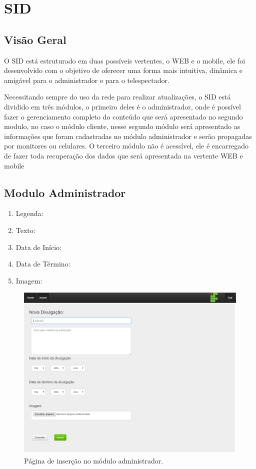 \chapter[SID]{SID}
\section{Visão Geral}
O SID está estruturado em duas possíveis vertentes, o WEB e o mobile, ele foi
desenvolvido com o objetivo de oferecer uma forma mais intuitiva, dinâmica e amigável
para o administrador e para o telespectador.

Necessitando sempre do uso da rede para realizar atualizações, o SID está dividido
em três módulos, o primeiro deles é o administrador, onde é possível fazer o gerenciamento
completo do conteúdo que será apresentado no segundo modulo, no caso o módulo cliente,
nesse segundo módulo será apresentado as informações que foram cadastradas no módulo
administrador e serão propagadas por monitores ou celulares. O terceiro módulo não é
acessível, ele é encarregado de fazer toda recuperação dos dados que será apresentada na
vertente WEB e mobile

\section{Modulo Administrador}
 \begin{enumerate}
   \item Legenda: 
   \item Texto: 
   \item Data de Início:
   \item Data de Término:
   \item Imagem:
 \end{enumerate}
 
 \begin{figure}[!htb]
\centering
\includegraphics[scale=0.6]{figuras/administrador1}
\caption{Página de inserção no módulo administrador.}
\label{Rotulo}
\end{figure}

